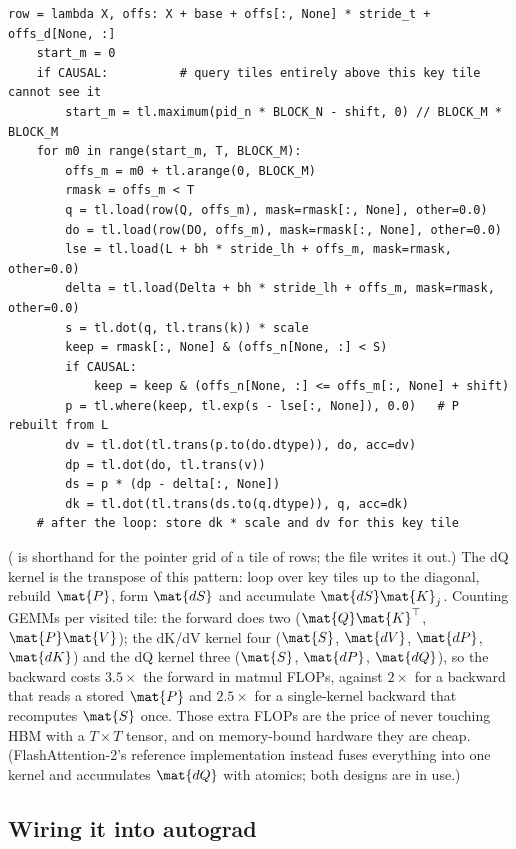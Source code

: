 \begin{lstlisting}[caption={The dK/dV kernel's loop over query tiles (reflowed).},label={lst:perf:dkdv}]
    row = lambda X, offs: X + base + offs[:, None] * stride_t + offs_d[None, :]
    start_m = 0
    if CAUSAL:          # query tiles entirely above this key tile cannot see it
        start_m = tl.maximum(pid_n * BLOCK_N - shift, 0) // BLOCK_M * BLOCK_M
    for m0 in range(start_m, T, BLOCK_M):
        offs_m = m0 + tl.arange(0, BLOCK_M)
        rmask = offs_m < T
        q = tl.load(row(Q, offs_m), mask=rmask[:, None], other=0.0)
        do = tl.load(row(DO, offs_m), mask=rmask[:, None], other=0.0)
        lse = tl.load(L + bh * stride_lh + offs_m, mask=rmask, other=0.0)
        delta = tl.load(Delta + bh * stride_lh + offs_m, mask=rmask, other=0.0)
        s = tl.dot(q, tl.trans(k)) * scale
        keep = rmask[:, None] & (offs_n[None, :] < S)
        if CAUSAL:
            keep = keep & (offs_n[None, :] <= offs_m[:, None] + shift)
        p = tl.where(keep, tl.exp(s - lse[:, None]), 0.0)   # P rebuilt from L
        dv = tl.dot(tl.trans(p.to(do.dtype)), do, acc=dv)
        dp = tl.dot(do, tl.trans(v))
        ds = p * (dp - delta[:, None])
        dk = tl.dot(tl.trans(ds.to(q.dtype)), q, acc=dk)
    # after the loop: store dk * scale and dv for this key tile
\end{lstlisting}

( is shorthand for the pointer grid of a tile of rows; the file writes it out.)
The dQ kernel is the transpose of this pattern: loop over key tiles up to the diagonal, rebuild
$\mat{P}$, form $\mat{dS}$ and accumulate $\mat{dS}\mat{K}_j$. Counting GEMMs per visited tile:
the forward does two ($\mat{Q}\mat{K}^\top$, $\mat{P}\mat{V}$); the dK/dV kernel four ($\mat{S}$,
$\mat{dV}$, $\mat{dP}$, $\mat{dK}$) and the dQ kernel three ($\mat{S}$, $\mat{dP}$, $\mat{dQ}$), so the
backward costs $3.5\times$ the forward in matmul FLOPs, against $2\times$ for a backward that reads a
stored $\mat{P}$ and $2.5\times$ for a single-kernel backward that recomputes $\mat{S}$ once. Those extra FLOPs are the price of never touching HBM with a $T\times T$ tensor, and on
memory-bound hardware they are cheap. (FlashAttention-2's reference implementation instead
fuses everything into one kernel and accumulates $\mat{dQ}$ with atomics; both designs are in use.)

\subsection{Wiring it into autograd}

